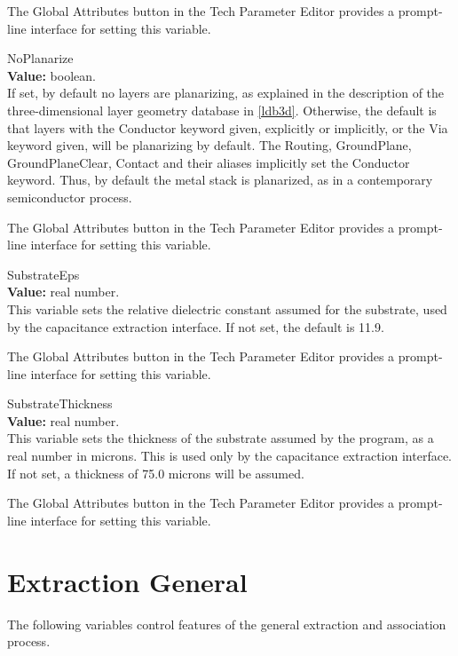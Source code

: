 \begin{description}
The {\cb Global Attributes} button in the {\cb Tech Parameter Editor}
provides a prompt-line interface for setting this variable.

\item{\et NoPlanarize}\\
{\bf Value:} boolean.\\
If set, by default no layers are planarizing, as explained in the
description of the three-dimensional layer geometry database in
\ref{ldb3d}.  Otherwise, the default is that layers with the {\vt
Conductor} keyword given, explicitly or implicitly, or the {\vt Via}
keyword given, will be planarizing by default.  The {\vt Routing},
{\vt GroundPlane}, {\vt GroundPlaneClear}, {\vt Contact} and their
aliases implicitly set the {\vt Conductor} keyword.  Thus, by default
the metal stack is planarized, as in a contemporary semiconductor
process.

The {\cb Global Attributes} button in the {\cb Tech Parameter Editor}
provides a prompt-line interface for setting this variable.

\item{\et SubstrateEps}\\
{\bf Value:} real number.\\
This variable sets the relative dielectric constant assumed for the
substrate, used by the capacitance extraction interface.  If not set,
the default is 11.9.

The {\cb Global Attributes} button in the {\cb Tech Parameter Editor}
provides a prompt-line interface for setting this variable.

\item{\et SubstrateThickness}\\
{\bf Value:} real number.\\
This variable sets the thickness of the substrate assumed by the
program, as a real number in microns.  This is used only by the
capacitance extraction interface.  If not set, a thickness of 75.0
microns will be assumed.

The {\cb Global Attributes} button in the {\cb Tech Parameter Editor}
provides a prompt-line interface for setting this variable.
\end{description}


\section{Extraction General}
The following variables control features of the general extraction and
association process.

